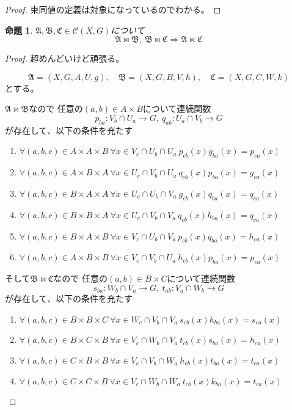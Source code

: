 \documentclass[leqno]{jsarticle}
\newtheorem{prop}[thm]{命題}
\newcommand{\To}{\Longrightarrow}
\begin{document}
\begin{proof}
束同値の定義は対象になっているのでわかる。
\end{proof}
\begin{prop}
$\mathfrak{A}, \mathfrak{B}, \mathfrak{C}\in \mathscr{C}(X,G)$について
\[
\mathfrak{A}\bowtie \mathfrak{B},\ \mathfrak{B}\bowtie \mathfrak{C}\To \mathfrak{A}\bowtie \mathfrak{C}
\]
\end{prop}
\begin{proof}
超めんどいけど頑張る。
\par
\[
\mathfrak{A}=(X, G, A, U, g),\quad \mathfrak{B}=(X, G, B, V, h), \quad \mathfrak{C}=(X, G, C, W, k)
\]
とする。
\par
$\mathfrak{A}\bowtie \mathfrak{B}$なので
任意の$(a, b)\in A\times B$について連続関数
\[
p_{ba}:V_b\cap U_a\to G,\ q_{ab}: U_a\cap V_b\to G
\]
が存在して、以下の条件を充たす
\begin{enumerate}
\item $\forall (a,b,c)\in A\times A\times B\ \forall x\in  V_c\cap U_b\cap U_a\ p_{cb}(x)g_{ba}(x)=p_{ca}(x) $
\item $\forall (a,b,c)\in A\times B\times A\ \forall x\in  U_c\cap V_b\cap U_a\ q_{cb}(x)p_{ba}(x)=g_{ca}(x) $
\item $\forall (a,b,c)\in B\times A\times A\ \forall x\in  U_c\cap U_b\cap V_a\ g_{cb}(x)q_{ba}(x)=q_{ca}(x) $
\item $\forall (a,b,c)\in B\times B\times A\ \forall x\in  U_c\cap V_b\cap V_a\ q_{cb}(x)h_{ba}(x)=q_{ca}(x) $
\item $\forall (a,b,c)\in B\times A\times B\ \forall x\in  V_c\cap U_b\cap V_a\ p_{cb}(x)q_{ba}(x)=h_{ca}(x) $
\item $\forall (a,b,c)\in A\times B\times B\ \forall x\in  V_c\cap V_b\cap U_a\ h_{cb}(x)p_{ba}(x)=p_{ca}(x) $
\end{enumerate}
そして$\mathfrak{B}\bowtie \mathfrak{C}$なので
任意の$(a, b)\in B\times C$について連続関数
\[
s_{ba}:W_b\cap V_a\to G,\ t_{ab}: V_a\cap W_b\to G
\]
が存在して、以下の条件を充たす
\begin{enumerate}
\item $\forall (a,b,c)\in B\times B\times C\ \forall x\in  W_c\cap V_b\cap V_a\ s_{cb}(x)h_{ba}(x)=s_{ca}(x) $
\item $\forall (a,b,c)\in B\times C\times B\ \forall x\in  V_c\cap W_b\cap V_a\ t_{cb}(x)s_{ba}(x)=h_{ca}(x) $
\item $\forall (a,b,c)\in C\times B\times B\ \forall x\in  V_c\cap V_b\cap W_a\ h_{cb}(x)t_{ba}(x)=t_{ca}(x) $
\item $\forall (a,b,c)\in C\times C\times B\ \forall x\in  V_c\cap W_b\cap W_a\ t_{cb}(x)k_{ba}(x)=t_{ca}(x) $

\end{enumerate}
\end{proof}
\end{document}
